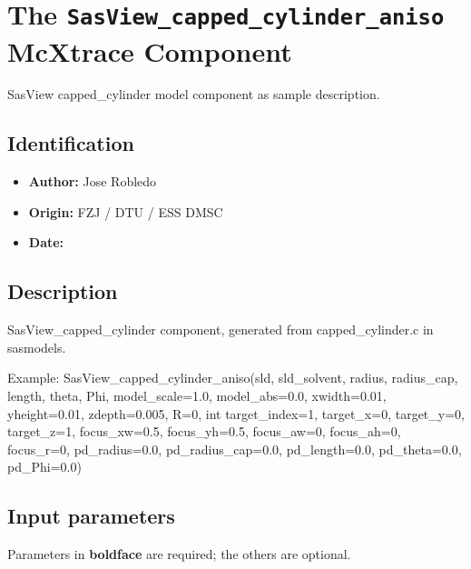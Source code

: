 \section{The \texttt{SasView\_capped\_cylinder\_aniso} McXtrace Component}
SasView capped\_cylinder model component as sample description.

\subsection*{Identification}
\begin{itemize}
  \item \textbf{Author:} Jose Robledo
  \item \textbf{Origin:} FZJ / DTU / ESS DMSC
  \item \textbf{Date:} 
\end{itemize}

\subsection*{Description}
SasView\_capped\_cylinder component, generated from capped\_cylinder.c in sasmodels.

Example: SasView\_capped\_cylinder\_aniso(sld, sld\_solvent, radius, radius\_cap, length, theta, Phi, model\_scale=1.0, model\_abs=0.0, xwidth=0.01, yheight=0.01, zdepth=0.005, R=0, int target\_index=1, target\_x=0, target\_y=0, target\_z=1, focus\_xw=0.5, focus\_yh=0.5, focus\_aw=0, focus\_ah=0, focus\_r=0, pd\_radius=0.0, pd\_radius\_cap=0.0, pd\_length=0.0, pd\_theta=0.0, pd\_Phi=0.0)

\subsection*{Input parameters}
Parameters in \textbf{boldface} are required; the others are optional.

